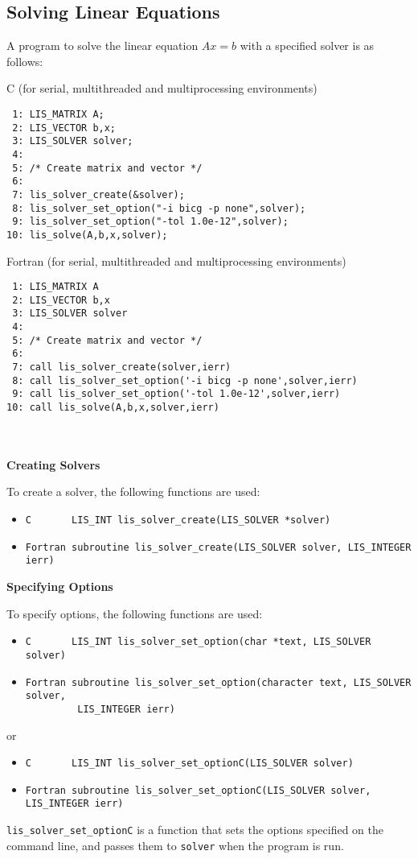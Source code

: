 \documentclass[a4paper]{article}
\begin{document}
\subsection{Solving Linear Equations}\label{subsec:solve}
A program to solve the linear equation $Ax = b$ with a specified 
solver is as follows: 
\begin{itemsquarebox}[l]{C (for serial, multithreaded and multiprocessing environments)}
\small
\begin{verbatim}
 1: LIS_MATRIX A; 
 2: LIS_VECTOR b,x; 
 3: LIS_SOLVER solver; 
 4:    
 5: /* Create matrix and vector */ 
 6:    
 7: lis_solver_create(&solver); 
 8: lis_solver_set_option("-i bicg -p none",solver); 
 9: lis_solver_set_option("-tol 1.0e-12",solver); 
10: lis_solve(A,b,x,solver); 
\end{verbatim}
\end{itemsquarebox}
\begin{itemsquarebox}[l]{Fortran (for serial, multithreaded and multiprocessing environments)}
\small
\begin{verbatim}
 1: LIS_MATRIX A 
 2: LIS_VECTOR b,x 
 3: LIS_SOLVER solver 
 4:    
 5: /* Create matrix and vector */ 
 6:    
 7: call lis_solver_create(solver,ierr) 
 8: call lis_solver_set_option('-i bicg -p none',solver,ierr) 
 9: call lis_solver_set_option('-tol 1.0e-12',solver,ierr) 
10: call lis_solve(A,b,x,solver,ierr) 
\end{verbatim}
\end{itemsquarebox}
\\ \\
\noindent
{\bf Creating Solvers}

To create a solver, the following functions are used:
\begin{itemize}
\item \verb|C       LIS_INT lis_solver_create(LIS_SOLVER *solver)|
\item \verb|Fortran subroutine lis_solver_create(LIS_SOLVER solver, LIS_INTEGER ierr) |
\end{itemize}

\noindent
{\bf Specifying Options}

To specify options, 
the following functions are used:
\begin{itemize}
\item \verb|C       LIS_INT lis_solver_set_option(char *text, LIS_SOLVER solver)|
\item \verb|Fortran subroutine lis_solver_set_option(character text, LIS_SOLVER solver,|\\
      \verb|         LIS_INTEGER ierr)|
\end{itemize}
or
\begin{itemize}
\item \verb|C       LIS_INT lis_solver_set_optionC(LIS_SOLVER solver)|
\item \verb|Fortran subroutine lis_solver_set_optionC(LIS_SOLVER solver, LIS_INTEGER ierr)|
\end{itemize}
\verb|lis_solver_set_optionC| is a function that sets the options specified 
on the command line, and passes them to \verb|solver| when the program is run. 
\end{document}
